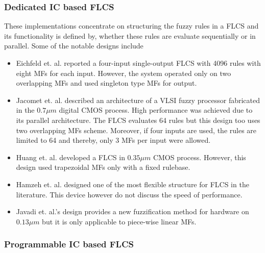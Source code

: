 \subsubsection{Dedicated IC based FLCS}
These implementations concentrate on structuring the fuzzy rules in a FLCS and its functionality is defined by, whether these rules are evaluate sequentially or in parallel. Some of the notable designs include
\begin{itemize}
	\item Eichfeld et. al.\cite{Eichfeld1992} reported a four\hyp{}input single\hyp{}output FLCS with 4096 rules with eight MFs for each input. However, the system {operated only on two overlapping MFs and used singleton type MFs for output}.
	\item Jacomet et. al.\cite{Jacomet1996} described an architecture of a VLSI fuzzy processor fabricated in the $ 0.7 \mu m $ digital CMOS process. High performance was achieved due to its parallel architecture. The FLCS evaluates 64 rules but {this design too uses two overlapping MFs scheme. Moreover, if four inputs are used, the rules are limited to 64 and thereby, only 3 MFs per input were allowed}.
	\item Huang et. al.\cite{Huang2005} developed a FLCS in $ 0.35 \mu m $ CMOS process. {However, this design used trapezoidal MFs only with a fixed rulebase.}
	\item Hamzeh et. al.\cite{Hamzeh2009} designed one of the most flexible structure for FLCS in the literature. {This device however do not discuss the speed of performance.}
	\item Javadi et. al.\cite{HajiSeyedJavadi2012}'s design provides a new fuzzification method for hardware on $ 0.13 \mu m $ but it is {only applicable to piece\hyp{}wise linear MFs.}
\end{itemize}

\subsubsection{Programmable IC based FLCS}
